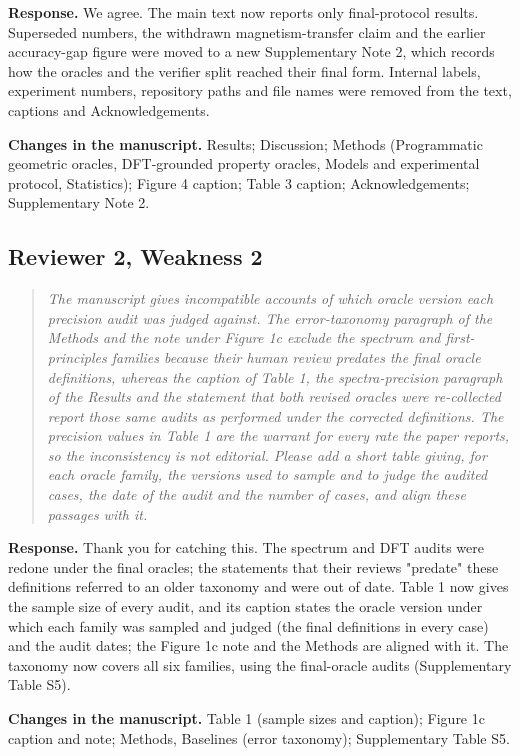 \documentclass[11pt,a4paper]{article}
\newenvironment{reviewer}{\begin{quote}\itshape\small}{\end{quote}}
\begin{document}
\textbf{Response.} We agree. The main text now reports only final-protocol results. Superseded numbers, the withdrawn magnetism-transfer claim and the earlier accuracy-gap figure were moved to a new Supplementary Note 2, which records how the oracles and the verifier split reached their final form. Internal labels, experiment numbers, repository paths and file names were removed from the text, captions and Acknowledgements.

\textbf{Changes in the manuscript.} Results; Discussion; Methods (Programmatic geometric oracles, DFT-grounded property oracles, Models and experimental protocol, Statistics); Figure 4 caption; Table 3 caption; Acknowledgements; Supplementary Note 2.

\subsection*{Reviewer 2, Weakness 2}

\begin{reviewer}The manuscript gives incompatible accounts of which oracle version each precision audit was judged against. The error-taxonomy paragraph of the Methods and the note under Figure 1c exclude the spectrum and first-principles families because their human review predates the final oracle definitions, whereas the caption of Table 1, the spectra-precision paragraph of the Results and the statement that both revised oracles were re-collected report those same audits as performed under the corrected definitions. The precision values in Table 1 are the warrant for every rate the paper reports, so the inconsistency is not editorial. Please add a short table giving, for each oracle family, the versions used to sample and to judge the audited cases, the date of the audit and the number of cases, and align these passages with it.\end{reviewer}

\textbf{Response.} Thank you for catching this. The spectrum and DFT audits were redone under the final oracles; the statements that their reviews "predate" these definitions referred to an older taxonomy and were out of date. Table 1 now gives the sample size of every audit, and its caption states the oracle version under which each family was sampled and judged (the final definitions in every case) and the audit dates; the Figure 1c note and the Methods are aligned with it. The taxonomy now covers all six families, using the final-oracle audits (Supplementary Table S5).

\textbf{Changes in the manuscript.} Table 1 (sample sizes and caption); Figure 1c caption and note; Methods, Baselines (error taxonomy); Supplementary Table S5.
\end{document}
